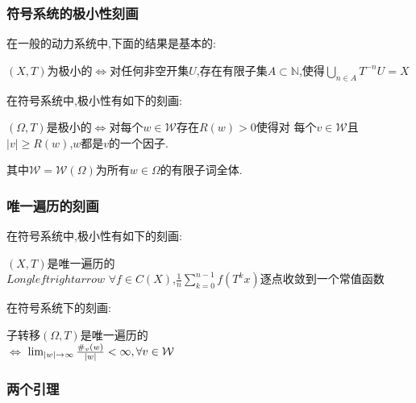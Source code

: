 \documentclass[compress,red]{beamer}
\begin{document}
\begin{frame}
\frametitle{符号系统的极小性刻画}
在一般的动力系统中,下面的结果是基本的:
\begin{theorem}
$(X,T)$为极小的$\Longleftrightarrow$对任何非空开集$U$,存在有限子集$A\subset \mathbb{N}$,使得$\bigcup_{n\in A}T^{-n}U=X$
\end{theorem}
\pause
在符号系统中,极小性有如下的刻画:
\begin{theorem}
$(\Omega,T)$是极小的$\Longleftrightarrow$对每个$w\in \mathcal{W}$存在$R(w)>0$使得对%
每个$v\in \mathcal{W}$且$|v|\geq R(w)$,$w$都是$v$的一个因子.
\end{theorem}
其中$\mathcal{W}=\mathcal{W}(\Omega)$为所有$w\in \Omega$的有限子词全体.
\end{frame}

\begin{frame}
\frametitle{唯一遍历的刻画}
在符号系统中,极小性有如下的刻画:
\begin{theorem}
$(X,T)$是唯一遍历的\\$Longleftrightarrow$
$\forall f\in C(X)$,$\frac{1}{n}\sum_{k=0}^{n-1}f(T^kx)$逐点收敛到一个常值函数
\end{theorem}
\pause
在符号系统下的刻画:
\begin{theorem}
子转移$(\Omega,T)$是唯一遍历的\\$\Longleftrightarrow$ $\lim_{|w| \to \infty}{\#_v(w)\over |w |}<\infty, \forall v\in \mathcal{W}$
\end{theorem}
\end{frame}

\begin{frame}
\frametitle{两个引理}
\end{frame}
\begin{frame}
\frametitle{}
\end{frame}
\end{document}
